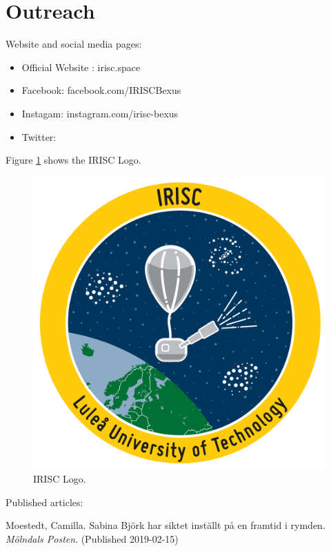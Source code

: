 \newpage
\section{Outreach} \label{sec:appB}

Website and social media pages: 

\begin{itemize}
	\item Official Website : irisc.space
	\item Facebook: facebook.com/IRISCBexus
	\item Instagam: instagram.com/irisc-bexus
	\item Twitter: 
\end{itemize}

Figure \ref{fig:loggo} shows the IRISC Logo.

\begin{figure}[H]
	\centering
	\includegraphics[scale=0.1]{0-cover/img/logo-irisc.png}
	\caption{IRISC Logo.}
	\label{fig:loggo}
\end{figure}

Published articles: 

Moestedt, Camilla. Sabina Björk har siktet inställt på en framtid i rymden. \textit{Mölndals Posten}. (Published 2019-02-15)